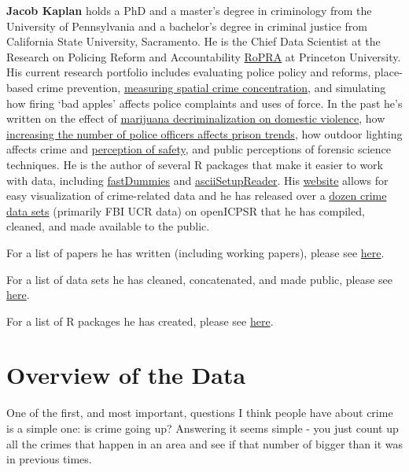 \documentclass[
  12pt,
  openany]{book}
\begin{document}
\textbf{Jacob Kaplan} holds a PhD and a master's degree in criminology from the University of Pennsylvania and a bachelor's degree in criminal justice from California State University, Sacramento. He is the Chief Data Scientist at the Research on Policing Reform and Accountability \href{https://policingresearch.org/team/}{RoPRA} at Princeton University. His current research portfolio includes evaluating police policy and reforms, place-based crime prevention, \href{https://doi.org/10.1177/0022427820984213}{measuring spatial crime concentration}, and simulating how firing `bad apples' affects police complaints and uses of force.
In the past he's written on the effect of \href{https://doi.org/10.1177/0886260520961876}{marijuana decriminalization on domestic violence}, how \href{https://doi.org/10.1111/1745-9133.12424}{increasing the number of police officers affects prison trends}, how outdoor lighting affects crime and \href{https://link.springer.com/article/10.1057/s41284-021-00296-0}{perception of safety}, and public perceptions of forensic science techniques. He is the author of several R packages that make it easier to work with data, including \href{https://jacobkap.github.io/fastDummies/}{fastDummies} and \href{https://jacobkap.github.io/asciiSetupReader/}{asciiSetupReader}. His \href{http://jacobdkaplan.com/}{website} allows for easy visualization of crime-related data and he has released over a \href{http://jacobdkaplan.com/data.html}{dozen crime data sets} (primarily FBI UCR data) on openICPSR that he has compiled, cleaned, and made available to the public.

For a list of papers he has written (including working papers), please see \href{http://jacobdkaplan.com/research.html}{here}.

For a list of data sets he has cleaned, concatenated, and made public, please see \href{http://jacobdkaplan.com/data.html}{here}.

For a list of R packages he has created, please see \href{https://jacobdkaplan.com/packages.html}{here}.

\hypertarget{ucrGeneral}{%
\chapter{Overview of the Data}\label{ucrGeneral}}

One of the first, and most important, questions I think people have about crime is a simple one: is crime going up? Answering it seems simple - you just count up all the crimes that happen in an area and see if that number of bigger than it was in previous times.
\end{document}
